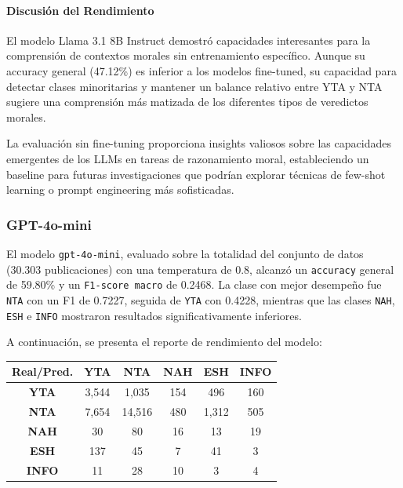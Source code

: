 \paragraph{Discusión del Rendimiento}

El modelo Llama 3.1 8B Instruct demostró capacidades interesantes para la comprensión de contextos morales sin entrenamiento específico. Aunque su accuracy general (47.12\%) es inferior a los modelos fine-tuned, su capacidad para detectar clases minoritarias y mantener un balance relativo entre YTA y NTA sugiere una comprensión más matizada de los diferentes tipos de veredictos morales.

La evaluación sin fine-tuning proporciona insights valiosos sobre las capacidades emergentes de los LLMs en tareas de razonamiento moral, estableciendo un baseline para futuras investigaciones que podrían explorar técnicas de few-shot learning o prompt engineering más sofisticadas.

\subsubsection{GPT-4o-mini}

El modelo \texttt{gpt-4o-mini}, evaluado sobre la totalidad del conjunto de datos (30.303 publicaciones) con una temperatura de 0.8, alcanzó un \texttt{accuracy} general de 59.80\% y un \texttt{F1-score macro} de 0.2468. La clase con mejor desempeño fue \texttt{NTA} con un F1 de 0.7227, seguida de \texttt{YTA} con 0.4228, mientras que las clases \texttt{NAH}, \texttt{ESH} e \texttt{INFO} mostraron resultados significativamente inferiores. 

A continuación, se presenta el reporte de rendimiento del modelo:

\begin{center}
\small
\begin{tabular}{c|ccccc}
\textbf{Real/Pred.} & \textbf{YTA} & \textbf{NTA} & \textbf{NAH} & \textbf{ESH} & \textbf{INFO} \\
\hline
\textbf{YTA} & 3,544 & 1,035 & 154 & 496 & 160 \\
\textbf{NTA} & 7,654 & 14,516 & 480 & 1,312 & 505 \\
\textbf{NAH} & 30 & 80 & 16 & 13 & 19 \\
\textbf{ESH} & 137 & 45 & 7 & 41 & 3 \\
\textbf{INFO} & 11 & 28 & 10 & 3 & 4 \\
\end{tabular}
\end{center}


